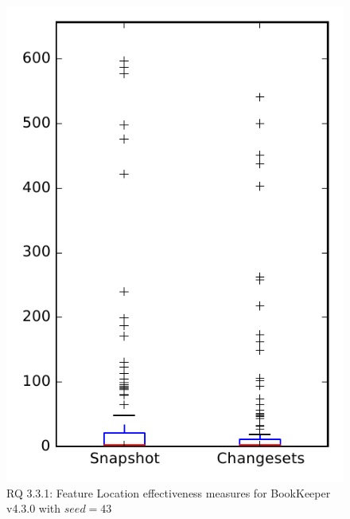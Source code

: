 
\begin{figure}
\centering
\includegraphics[height=0.4\textheight]{figures/flt_seed/rq1_bookkeeper_43}
\caption{RQ 3.3.1: Feature Location effectiveness measures for BookKeeper v4.3.0 with $seed=43$}
\label{fig:flt_seed:rq1:bookkeeper}
\end{figure}
